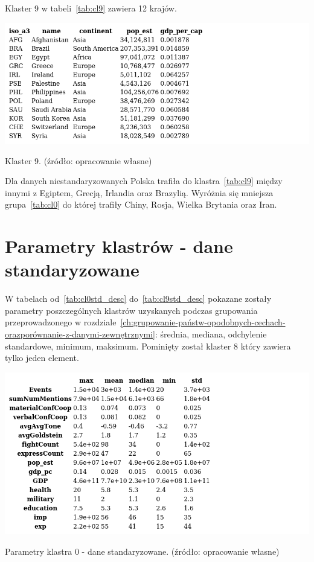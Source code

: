 \documentclass[11pt]{report}
\begin{document}
    Klaster 9 w tabeli~\ref{tab:cl9} zawiera 12 krajów.
    \begin{table}[!htp]
        \centering
        \includegraphics[width=\linewidth]{tables/CLUST/clust9kmeans.png}
        \caption{Klaster 9. (źródło: opracowanie własne)}
        \label{tab:cl9}
    \end{table}

    Dla danych niestandaryzowanych Polska trafiła do klastra~\ref{tab:cl9} między innymi z Egiptem, Grecją, Irlandia oraz Brazylią.
    Wyróżnia się mniejsza grupa~\ref{tab:cl0} do której trafiły Chiny, Rosja, Wielka Brytania oraz Iran.


    \chapter{Parametry klastrów - dane standaryzowane}\label{ch:parametry-klastrów---dane-standaryzowane}
    W tabelach od~\ref{tab:cl0std_desc} do~\ref{tab:cl9std_desc} pokazane zostały parametry poszczególnych klastrów uzyskanych podczas grupowania przeprowadzonego w rozdziale~\ref{ch:grupowanie-państw-opodobnych-cechach-orazporównanie-z-danymi-zewnętrznymi}: średnia, mediana, odchylenie standardowe, minimum, maksimum.
    Pominięty został klaster 8 który zawiera tylko jeden element.

    \begin{table}[!htp]
        \centering
        \includegraphics[width=\linewidth]{tables/CLUST/desc/clust0std_desc.png}
        \caption{Parametry klastra 0 - dane standaryzowane. (źródło: opracowanie własne)}
        \label{tab:cl0std_desc}
    \end{table}
\end{document}
